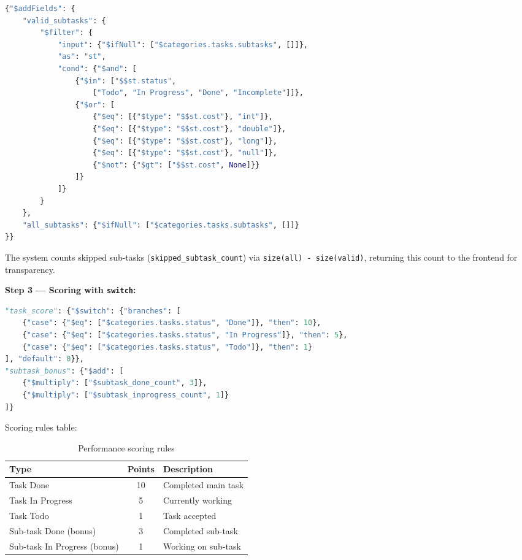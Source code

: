 \documentclass[a4paper,12pt]{article}
\begin{document}
\begin{lstlisting}[language=Python, caption=Data Cleansing --- filtering valid subtasks]
{"$addFields": {
    "valid_subtasks": {
        "$filter": {
            "input": {"$ifNull": ["$categories.tasks.subtasks", []]},
            "as": "st",
            "cond": {"$and": [
                {"$in": ["$$st.status",
                    ["Todo", "In Progress", "Done", "Incomplete"]]},
                {"$or": [
                    {"$eq": [{"$type": "$$st.cost"}, "int"]},
                    {"$eq": [{"$type": "$$st.cost"}, "double"]},
                    {"$eq": [{"$type": "$$st.cost"}, "long"]},
                    {"$eq": [{"$type": "$$st.cost"}, "null"]},
                    {"$not": {"$gt": ["$$st.cost", None]}}
                ]}
            ]}
        }
    },
    "all_subtasks": {"$ifNull": ["$categories.tasks.subtasks", []]}
}}
\end{lstlisting}

The system counts skipped sub-tasks (\texttt{skipped\_subtask\_count}) via \texttt{size(all) - size(valid)}, returning this count to the frontend for transparency.

\textbf{Step 3 --- Scoring with \texttt{switch}:}
\begin{lstlisting}[language=Python, caption=Performance scoring rules]
"task_score": {"$switch": {"branches": [
    {"case": {"$eq": ["$categories.tasks.status", "Done"]}, "then": 10},
    {"case": {"$eq": ["$categories.tasks.status", "In Progress"]}, "then": 5},
    {"case": {"$eq": ["$categories.tasks.status", "Todo"]}, "then": 1}
], "default": 0}},
"subtask_bonus": {"$add": [
    {"$multiply": ["$subtask_done_count", 3]},
    {"$multiply": ["$subtask_inprogress_count", 1]}
]}
\end{lstlisting}

Scoring rules table:
\begin{table}[H]
\centering
\begin{tabular}{|l|c|l|}
\hline
\textbf{Type} & \textbf{Points} & \textbf{Description} \\ \hline
Task Done & 10 & Completed main task \\ \hline
Task In Progress & 5 & Currently working \\ \hline
Task Todo & 1 & Task accepted \\ \hline
Sub-task Done (bonus) & 3 & Completed sub-task \\ \hline
Sub-task In Progress (bonus) & 1 & Working on sub-task \\ \hline
\end{tabular}
\caption{Performance scoring rules}
\end{table}
\end{document}
